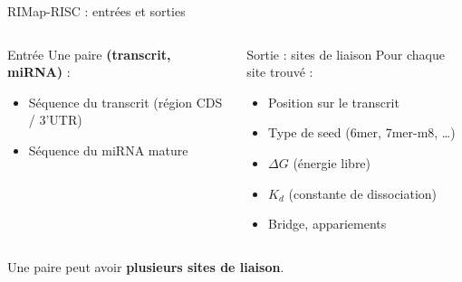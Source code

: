\begin{frame}{RIMap-RISC : entrées et sorties}
\begin{columns}[T, onlytextwidth]
	\begin{block}{Entrée}
		Une paire \textbf{(transcrit, miRNA)} :
		\begin{itemize}
			\item Séquence du transcrit (région CDS / 3'UTR)
			\item Séquence du miRNA mature
		\end{itemize}
	\end{block}

	\begin{block}{Sortie : sites de liaison}
		Pour chaque site trouvé :
		\begin{itemize}
			\item Position sur le transcrit
			\item Type de seed (6mer, 7mer-m8, \ldots)
			\item $\Delta G$ (énergie libre)
			\item $K_d$ (constante de dissociation)
			\item Bridge, appariements
		\end{itemize}
	\end{block}
\end{columns}

\vspace{0.5em}
\centering
\small Une paire peut avoir \textbf{plusieurs sites de liaison}.
\end{frame}
